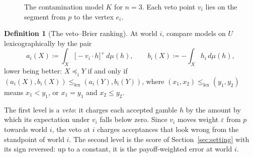 \documentclass[11pt]{article}
\newcommand{\lexle}{\le_{\mathrm{lex}}}
\theoremstyle{plain}
\theoremstyle{definition}
\newtheorem{definition}[theorem]{Definition}
\theoremstyle{remark}
\begin{document}
\begin{figure}[ht]
\centering
{}
\caption{The contamination model $K$ for $n=3$. Each veto point $v_i$ lies on the segment from
$p$ to the vertex $e_i$.}
\label{fig:contam}
\end{figure}

\begin{definition}[The veto--Brier ranking]\label{def:veto-brier}
At world $i$, compare models on $U$ lexicographically by the pair
\[
  a_i(X)\coloneqq\int_X\bigl[-v_i\cdot h\bigr]^+\,d\mu(h),\qquad b_i(X)\coloneqq-\int_Xh_i\,
  d\mu(h),
\]
lower being better: $X\preceq_iY$ if and only if $(a_i(X),b_i(X))\lexle(a_i(Y),b_i(Y))$, where
$(x_1,x_2)\lexle(y_1,y_2)$ means $x_1<y_1$, or $x_1=y_1$ and $x_2\le y_2$.
\end{definition}

The first level is a \emph{veto}: it charges each accepted gamble $h$ by the amount by which its
expectation under $v_i$ falls below zero. Since $v_i$ moves weight $\varepsilon$ from $p$ towards
world $i$, the veto at $i$ charges acceptances that look wrong from the standpoint of world $i$.
The second level is the score of Section~\ref{sec:setting} with its sign reversed: up to a
constant, it is the payoff-weighted error at world $i$.
\end{document}
